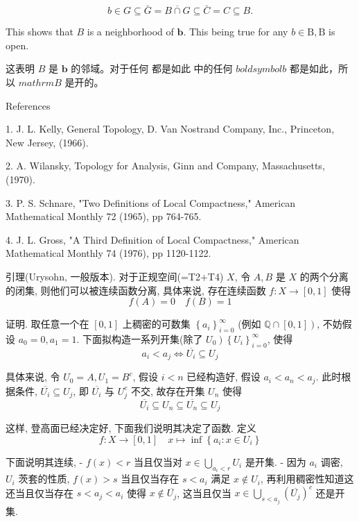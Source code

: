 \documentclass[options]{article}
\begin{document}
\[
	b \in G \subseteq \bar{G}=\overline{B \cap G} \subseteq \bar{C}=C \subseteq B .
\]
\begin{paracol}{2}
	
	\begin{en}
		This shows that $B$ is a neighborhood of $\mathbf{b}$. This being true for any
		$b \in \mathrm{B}, \mathrm{B}$ is open.
	\end{en}
	\begin{cn}
		这表明 $B$ 是 $\mathbf{b}$ 的邻域。对于任何
		都是如此 中的任何 $boldsymbol{b}$ 都是如此，所以 $mathrm{B}$ 是开的。
	\end{cn}
\end{paracol}

References 

1. J. L. Kelly, General Topology, D. Van Nostrand Company, Inc., Princeton,
New Jersey, (1966). 

2. A. Wilansky, Topology for Analysis, Ginn and Company,
Massachusetts, (1970). 

3. P. S. Schnare, "Two Definitions of Local Compactness," American
Mathematical Monthly 72 (1965), pp 764-765. 

4. J. L. Gross, "A Third Definition of Local
Compactness," American Mathematical Monthly 74 (1976), pp 1120-1122.

\linespread{1.3}\selectfont

引理(Urysohn, 一般版本). 对于正规空间(=T2+T4) $X$, 令 $A, B$ 是 $X$ 的两个分离的闭集, 则他们可以被连续函数分离, 具体来说, 存在连续函数 $f: X \rightarrow[0,1]$ 使得
\[
f(A)=0 \quad f(B)=1
\]

证明. 取任意一个在 $[0,1]$ 上稠密的可数集 $\left\{a_i\right\}_{i=0}^{\infty}$ (例如 $\left.\mathbb{Q} \cap[0,1]\right)$, 不妨假设 $a_0=0, a_1=1$. 下面拟构造一系列开集(除了 $\left.U_0\right)\left\{U_i\right\}_{i=0}^{\infty}$, 使得
\[
a_i<a_j \Longleftrightarrow \overline{U_i} \subseteq U_j
\]

具体来说, 令 $U_0=A, U_1=B^c$, 假设 $i<n$ 已经构造好, 假设 $a_i<a_n<a_j$. 此时根据条件, $\overline{U_i} \subseteq U_j$, 即 $\overline{U_i}$ 与 $U_j^c$ 不交, 故存在开集 $U_n$ 使得
\[
\overline{U_i} \subseteq U_n \subseteq \overline{U_n} \subseteq U_j
\]

这样, 登高面已经决定好, 下面我们说明其决定了函数. 定义
\[
f: X \longrightarrow[0,1] \quad x \longmapsto \inf \left\{a_i: x \in U_i\right\}
\]

下面说明其连续,
- $f(x)<r$ 当且仅当对 $x \in \bigcup_{a_i<r} U_i$ 是开集.
- 因为 $a_i$ 调密, $U_i$ 茨套的性质, $f(x)>s$ 当且仅当存在 $s<a_i$ 满足 $x \notin U_i$, 再利用稠密性知道这还当且仅当存在 $s<a_j<a_i$ 使得 $x \notin \overline{U_j}$, 这当且仅当 $x \in \bigcup_{s<a_j}\left(\overline{U_j}\right)^c$ 还是开集.
\end{document}
